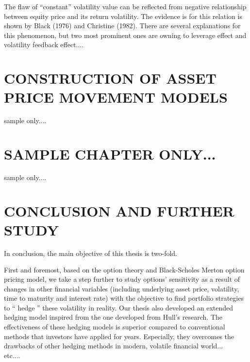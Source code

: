 \documentclass[12pt,a4paper,oneside]{book}
\begin{document}
The flaw of ``constant'' volatility value can be reflected from negative relationship between equity price and its return volatility. The evidence is for this relation is shown by Black (1976) and Christine (1982). There are several explanations for this phenomenon, but two most prominent ones are owning to leverage effect and volatility feedback effect....

\chapter{CONSTRUCTION OF ASSET PRICE MOVEMENT MODELS}	
sample only....\\
\newpage

\chapter{SAMPLE CHAPTER ONLY...}	
sample only....\\
\newpage

\chapter{CONCLUSION AND FURTHER STUDY}	
 
 In conclusion, the main objective of this thesis is two-fold. 
 
 First and foremost, based on the option theory and Black-Scholes Merton option pricing model, we take a step further to study options' sensitivity as a result of changes in other financial variables (including underlying asset price, volatility, time to maturity and interest rate) with the objective to find portfolio strategies to `` hedge '' these volatility in reality. Our thesis also developed an extended hedging model inspired from the one developed from Hull's research. The effectiveness of these hedging models is superior compared to conventional methods that investors have applied for years. Especially, they overcomes the drawbacks of other hedging methods in modern, volatile financial world... \\
 etc....
 
	\newpage 
	\clearpage	
\end{document}
